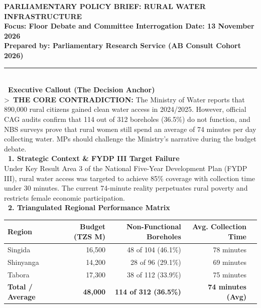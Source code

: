 \documentclass[11pt, a4paper]{report}
\begin{document}
\begin{tcolorbox}[colback=lightgrey, colframe=bordergrey, title=\textbf{Deliverable 5B Preview: \texttt{Report2\_Policy\_Brief\_Water\_Oversight.md}}]
\small
\textcolor{tanzaniablue}{\textbf{PARLIAMENTARY POLICY BRIEF: RURAL WATER INFRASTRUCTURE}}\\
\textbf{\textcolor{tanzaniablue}{Focus:} Floor Debate and Committee Interrogation \quad \textbar{} \quad \textcolor{suagreen}{\textbf{Date:}} 13 November 2026}\\
\textbf{\textcolor{tanzaniablue}{Prepared by:} Parliamentary Research Service (AB Consult Cohort 2026)}\\[0.2cm]
\rule{\textwidth}{0.4pt}\\[0.2cm]
\textcolor{tanzaniablue}{\textbf{\ Executive Callout (The Decision Anchor)}}\\
\textgreater\ \textbf{THE CORE CONTRADICTION:} The Ministry of Water reports that 890,000 rural citizens gained clean water access in 2024/2025. However, official CAG audits confirm that 114 out of 312 boreholes (36.5\%) do not function, and NBS surveys prove that rural women still spend an average of 74 minutes per day collecting water. MPs should challenge the Ministry's narrative during the budget debate.\\[0.2cm]
\textcolor{tanzaniablue}{\textbf{\ 1. Strategic Context \& FYDP III Target Failure}}\\
Under Key Result Area 3 of the National Five-Year Development Plan (FYDP III), rural water access was targeted to achieve 85\% coverage with collection time under 30 minutes. The current 74-minute reality perpetuates rural poverty and restricts female economic participation.\\[0.2cm]
\textcolor{tanzaniablue}{\textbf{\ 2. Triangulated Regional Performance Matrix}}\\
\begin{tabular}{lrrrr}
\toprule
\textbf{Region} & \textbf{Budget (TZS M)} & \textbf{Non-Functional Boreholes} & \textbf{Avg. Collection Time} \\
\midrule
Singida & 16,500 & 48 of 104 (46.1\%) & 78 minutes \\
Shinyanga & 14,200 & 28 of 96 (29.1\%) & 69 minutes \\
Tabora & 17,300 & 38 of 112 (33.9\%) & 75 minutes \\
\midrule
\textbf{Total / Average} & \textbf{48,000} & \textbf{114 of 312 (36.5\%)} & \textbf{74 minutes (Avg)} \\
\bottomrule
\end{tabular}\\[0.2cm]

\end{tcolorbox}
\end{document}
